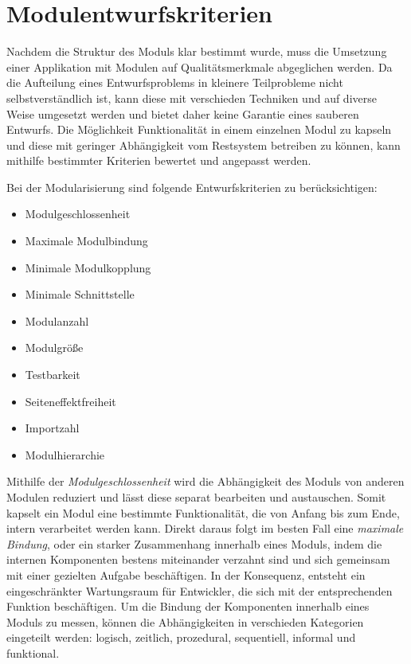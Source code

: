   \section{Modulentwurfskriterien} \label{sec:MEK}
    Nachdem die Struktur des Moduls klar bestimmt wurde, muss die Umsetzung einer Applikation mit Modulen auf Qualitätsmerkmale abgeglichen werden. Da die Aufteilung eines Entwurfsproblems in kleinere Teilprobleme nicht selbstverständlich ist, kann diese mit verschieden Techniken und auf diverse Weise umgesetzt werden und bietet daher keine Garantie eines sauberen Entwurfs. Die Möglichkeit Funktionalität in einem einzelnen Modul zu kapseln und diese mit geringer Abhängigkeit vom Restsystem betreiben zu können, kann mithilfe bestimmter Kriterien bewertet und angepasst werden. \cite{softModDes,softMdDes2,modulMitJava9,java9modRevealed,modulProgJava9}\bigbreak
    
    Bei der Modularisierung sind folgende Entwurfskriterien zu berücksichtigen: 
    \begin{itemize}
      \item Modulgeschlossenheit 
      \item Maximale Modulbindung 
      \item Minimale Modulkopplung 
      \item Minimale Schnittstelle 
      \item Modulanzahl 
      \item Modulgröße 
      \item Testbarkeit 
      \item Seiteneffektfreiheit 
      \item Importzahl 
      \item Modulhierarchie 
    \end{itemize}
    Mithilfe der \textit{Modulgeschlossenheit} wird die Abhängigkeit des Moduls von anderen Modulen reduziert und lässt diese separat bearbeiten und austauschen. Somit kapselt ein Modul eine bestimmte Funktionalität, die von Anfang bis zum Ende, intern verarbeitet werden kann. Direkt daraus folgt im besten Fall eine \textit{maximale Bindung}, oder ein starker Zusammenhang innerhalb eines Moduls, indem die internen Komponenten bestens miteinander verzahnt sind und sich gemeinsam mit einer gezielten Aufgabe beschäftigen. In der Konsequenz, entsteht ein eingeschränkter Wartungsraum für Entwickler, die sich mit der entsprechenden Funktion beschäftigen. Um die Bindung der Komponenten innerhalb eines Moduls zu messen, können die Abhängigkeiten in verschieden Kategorien eingeteilt werden: logisch, zeitlich, prozedural, sequentiell, informal und funktional.

